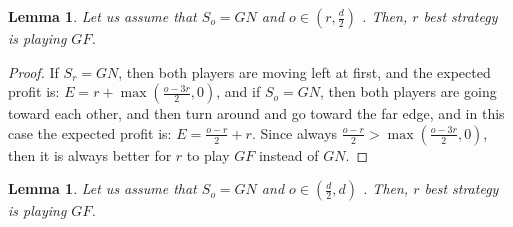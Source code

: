 \documentclass[a4paper,10pt]{article}
\newtheorem{lemma}[theorem]{Lemma}
\newcommand\rob{\ensuremath{r}\xspace}
\newcommand\opp{\ensuremath{o}\xspace}
\newcommand{\gn}{\ensuremath{GN}\xspace}
\newcommand{\gf}{\ensuremath{GF}\xspace}
\begin{document}
\begin{lemma}
Let us assume that $S_{\opp}=\gn$ and $o \in \left(r,\frac{d}{2}\right)$ . Then, \rob best strategy is playing $\gf$.
\end{lemma}
\begin{proof}
If $S_{\rob}=\gn$, then both players are moving left at first, and the expected profit is: $E=r+\max\left(\frac{o-3r}{2},0\right)$, and if $S_{\opp}=\gn$, then both players are going toward each other, and then turn around and go toward the far edge, and in this case the expected profit is: $E=\frac{o-r}{2}+r$. Since always $\frac{o-r}{2}>\max\left(\frac{o-3r}{2},0\right)$, then it is always better for \rob to play $\gf$ instead of \gn.
\end{proof}

\begin{lemma}
Let us assume that $S_{\opp}=\gn$ and $o \in \left(\frac{d}{2},d\right)$ . Then, \rob best strategy is playing $\gf$.
\end{lemma}
\end{document}
